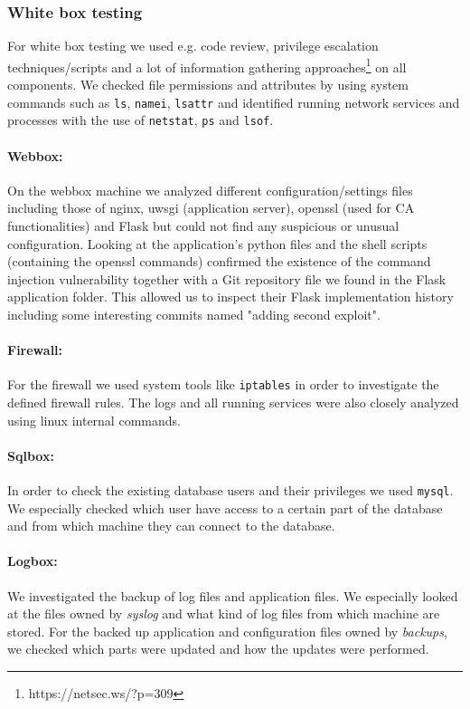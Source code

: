 \documentclass[english]{article}
\newcommand{\code}[1]{\texttt{#1}}
\begin{document}
\subsubsection{White box testing}
For white box testing we used e.g. code review, privilege escalation techniques/scripts and a lot of information gathering approaches\footnote{https://netsec.ws/?p=309} on all components. We checked file permissions and attributes by using system commands such as \code{ls}, \code{namei}, \code{lsattr} and identified running network services and processes with the use of \code{netstat}, \code{ps} and \code{lsof}. 
\paragraph{Webbox:} On the webbox machine we analyzed different configuration/settings files including those of nginx, uwsgi (application server), openssl (used for CA functionalities) and Flask but could not find any suspicious or unusual configuration. Looking at the application's python files and the shell scripts (containing the openssl commands) confirmed the existence of the command injection vulnerability together with a Git repository file  we found in the Flask application folder. This allowed us to inspect their Flask implementation history including some interesting commits named "adding second exploit".
\paragraph{Firewall:} For the firewall we used system tools like \code{iptables} in order to investigate the defined firewall rules. The logs and all running services were also closely analyzed using linux internal commands.  

\paragraph{Sqlbox:} In order to check the existing database users and their privileges we used \code{mysql}. We especially checked which user have access to a certain part of the database and from which machine they can connect to the database.

\paragraph{Logbox:} We investigated the backup of log files and application files. We especially looked at the files owned by \textit{syslog} and what kind of log files from which machine are stored. For the backed up application and configuration files owned by \textit{backups}, we checked which parts were updated and how the updates were performed.
\end{document}
